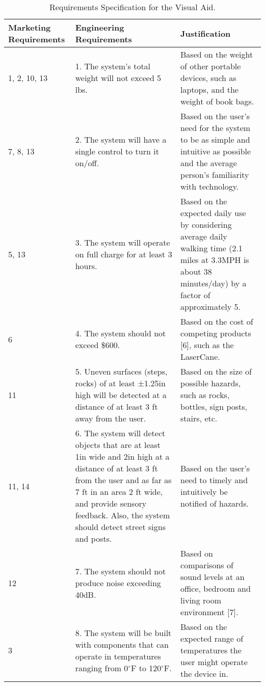 \begin{table}[h]
\small
\caption{Requirements Specification for the Visual Aid.}
\label{table:caseStudyRequirements}
\begin{tabular}{|p{2cm}|p{5cm}|p{6cm}|} \hline
\rowcolor{Gray}
\textbf{Marketing Requirements} & \textbf{Engineering Requirements} & \textbf{Justification} \\ \hline
1, 2, 10, 13 & 
		1. The system's total weight will not exceed 5 lbs. & 
		Based on the weight of other portable devices, such as
		laptops, and the weight of book bags. \\ \hline
		
7, 8, 13 & 
		2. The system will have a single control to turn it on/off.  & 
		Based on the user's need for the system to be as simple
		and intuitive as possible and the average person's familiarity with
		technology. \\ \hline
		
5, 13 & 
		3. The system will operate on full charge for at least 3 hours. &
		Based on the expected daily use by considering average
		daily walking time (2.1 miles at 3.3MPH is about 38 minutes/day) by a factor of
		approximately 5. \\ \hline
		
6 & 
		4. The system should not exceed \$600.		&
		Based on the cost of competing products {[}6{]}, such
		as the LaserCane. \\ \hline
		
11 & 
		5. Uneven surfaces (steps, rocks) of at least ±1.25in high will be
		  detected at a distance of at least 3 ft away from the user. &
		Based on the size of possible hazards, such as rocks,
		bottles, sign posts, stairs, etc. \\ \hline
		
11, 14 & 
		6. The system will detect objects that are at least 1in wide and 2in high
		  at a distance of at least 3 ft from the user and as far as 7 ft in an
		  area 2 ft wide, and provide sensory feedback. Also, the system should
		  detect street signs and posts.		&
		Based on the user's need to timely and intuitively be
		notified of hazards. \\ \hline
		
		
12 &
		7. The system should not produce noise exceeding 40dB.	&
		Based on comparisons of sound levels at an office,
		bedroom and living room environment {[}7{]}. \\ \hline

3 & 
		8.  The system will be built with components that can operate in
		  temperatures ranging from 0$^\circ$F to 120$^\circ$F.		&
		Based on the expected range of temperatures the user
		might operate the device in. \\	\hline


\end{tabular}
\end{table}
